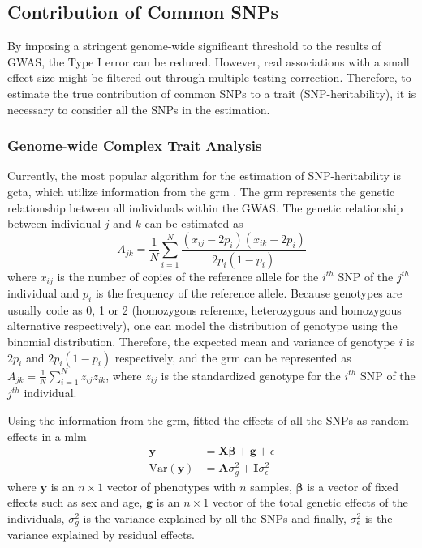 \documentclass[12pt]{scrbook}
\begin{document}
\subsection{Contribution of Common SNPs}
By imposing a stringent genome-wide significant threshold to the results of \gls{GWAS}, the Type I error can be reduced. 
However, real associations with a small effect size might be filtered out through multiple testing correction.
Therefore, to estimate the true contribution of common \glspl{SNP} to a trait (\gls{SNP}-heritability), it is necessary to consider all the \glspl{SNP} in the estimation.

\subsubsection{Genome-wide Complex Trait Analysis}
Currently, the most popular algorithm for the estimation of \gls{SNP}-heritability is \gls{gcta}, which utilize information from the \gls{grm} \citep{Yang2011}.
The \gls{grm} represents the genetic relationship between all individuals within the \gls{GWAS}.
The genetic relationship between individual $j$ and $k$ can be estimated as 
\begin{equation}
A_{jk} = \frac{1}{N}\sum^N_{i=1}\frac{(x_{ij}-2p_i)(x_{ik}-2p_i)}{2p_i(1-p_i)}
\end{equation}
where $x_{ij}$ is the number of copies of the reference allele for the $i^{th}$ \gls{SNP} of the $j^{th}$ individual and $p_i$ is the frequency of the reference allele.
Because genotypes are usually code as 0, 1 or 2 (homozygous reference, heterozygous and homozygous alternative respectively), one can model the distribution of genotype using the binomial distribution.
Therefore, the expected mean and variance of genotype $i$ is $2p_i$ and $2p_i(1-p_i)$ respectively, and the \gls{grm} can be represented as $A_{jk} = \frac{1}{N}\sum^N_{i=1}z_{ij}z_{ik}$, where $z_{ij}$ is the standardized genotype for the $i^{th}$ \gls{SNP} of the $j^{th}$ individual.

Using the information from the \gls{grm}, \citet{Yang2011} fitted the effects of all the \glspl{SNP} as random effects in a \gls{mlm}
\begin{align}
\boldsymbol{y} &= \boldsymbol{X\beta}+\boldsymbol{g}+\epsilon\\
\mathrm{Var}(\boldsymbol{y}) &= \boldsymbol{A}\sigma_g^2+\boldsymbol{I}\sigma_\epsilon^2
\label{eq:gctaEq}
\end{align}
where $\boldsymbol{y}$ is an $n\times 1$ vector of phenotypes with $n$ samples, $\boldsymbol{\beta}$ is a vector of fixed effects such as sex and age, $\boldsymbol{g}$ is an $n\times 1$ vector of the total genetic effects of the individuals, $\sigma_g^2$ is the variance explained by all the \glspl{SNP} and finally, $\sigma_\epsilon^2$ is the variance explained by residual effects.
\end{document}
